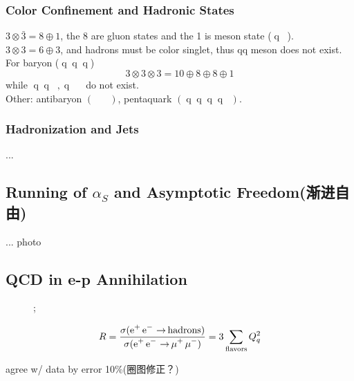 \documentclass[a4paper]{article}
\DeclareMathOperator{\ra}{\rightarrow}
\DeclareMathOperator{\q}{\mathrm{q}}
\DeclareMathOperator{\bq}{\bar{\mathrm{q}}}
\newcommand{\pa}{particle}
\numberwithin{equation}{section}
\begin{document}
\subsubsection{Color Confinement and Hadronic States}
$ 3\otimes \bar{3} = 8 \oplus 1 $, the 8 are gluon states and the 1 is meson state ($ \q\bq $).\\
$ 3\otimes 3 = 6 \oplus 3 $, and hadrons must be color singlet, thus qq meson does not exist.\\

For baryon ($ \q\q\q $)
\begin{equation}\label{key}
3 \otimes 3 \otimes 3 = 10 \oplus 8 \oplus 8 \oplus 1
\end{equation}
while $ \q\q\bq, \q\bq\bq $ do not exist.\\
Other: antibaryon $ (\bq\bq\bq)$, pentaquark $ (\q\q\q\q\bq) $.

\subsubsection{Hadronization and Jets}
...

\subsection{Running of $ \alpha_S $ and Asymptotic Freedom(渐进自由)}
... photo

\subsection{QCD in e-p Annihilation}
\begin{figure}[H]
	\centering
	\feynmandiagram [horizontal = b to e]{
		a [\pa=$ e^- $] -- [fermion] b -- [fermion] c [\pa=$ e^+ $],
		b -- [photon] e,
		d [\pa=$ \bq $] -- [fermion] e -- [fermion] f [\pa=$ \q $],
	};
\end{figure}
\begin{equation}\label{key}
R = \dfrac{\sigma(\ce{e^+ e^- \ra \text{hadrons}})}{\sigma(\ce{e^+ e^- \ra \mu^+ \mu^-})} = 3\sum_{\text{flavors}} Q_q^2
\end{equation}

agree w/ data by error 10\%(圈图修正？)\\

\subsection{}
\subsection{}
\end{document}
